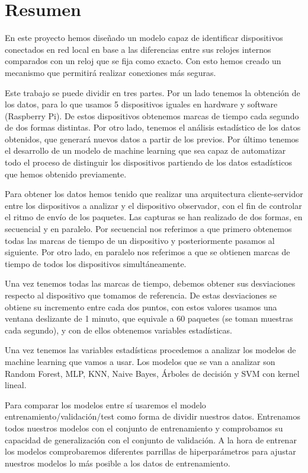 
\chapter*{Resumen}
 \label{chap:resumen}

En este proyecto hemos diseñado un modelo capaz de identificar dispositivos conectados en red local en base a las diferencias entre sus relojes internos comparados con un reloj que se fija como exacto. Con esto hemos creado un mecanismo que permitirá realizar conexiones más seguras.

Este trabajo se puede dividir en tres partes. Por un lado tenemos la obtención de los datos, para lo que usamos 5 dispositivos iguales en hardware y software (Raspberry Pi). De estos dispositivos obtenemos marcas de tiempo cada segundo de dos formas distintas. Por otro lado, tenemos el análisis estadístico de los datos obtenidos, que generará nuevos datos a partir de los previos. Por último tenemos el desarrollo de un modelo de machine learning que sea capaz de automatizar todo el proceso de distinguir los dispositivos partiendo de los datos estadísticos que hemos obtenido previamente.

Para obtener los datos hemos tenido que realizar una arquitectura cliente-servidor entre los dispositivos a analizar y el dispositivo observador, con el fin de controlar el ritmo de envío de los paquetes. Las capturas se han realizado de dos formas, en secuencial y en paralelo. Por secuencial nos referimos a que primero obtenemos todas las marcas de tiempo de un dispositivo y posteriormente pasamos al siguiente. Por otro lado, en paralelo nos referimos a que se obtienen marcas de tiempo de todos los dispositivos simultáneamente.

Una vez tenemos todas las marcas de tiempo, debemos obtener sus desviaciones respecto al dispositivo que tomamos de referencia. De estas desviaciones se obtiene su incremento entre cada dos puntos, con estos valores usamos una ventana deslizante de 1 minuto, que equivale a 60 paquetes (se toman muestras cada segundo), y con de ellos obtenemos variables estadísticas.

Una vez tenemos las variables estadísticas procedemos a analizar los modelos de machine learning que vamos a usar. Los modelos que se van a analizar son Random Forest, MLP, KNN, Naive Bayes, Árboles de decisión y SVM con kernel lineal. 

Para comparar los modelos entre sí usaremos el modelo entrenamiento/validación/test como forma de dividir nuestros datos. Entrenamos todos nuestros modelos con el conjunto de entrenamiento y comprobamos su capacidad de generalización con el conjunto de validación. A la hora de entrenar los modelos comprobaremos diferentes parrillas de hiperparámetros para ajustar nuestros modelos lo más posible a los datos de entrenamiento.

